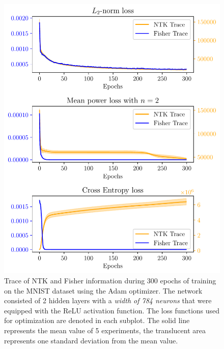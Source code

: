 \begin{figure}
	\centering
	\includegraphics{text/results/FisherNTKComparisonPlots/Triple_comparison_losses2_784.pdf}
	\caption{Trace of NTK and Fisher information during 300 epochs of training on the MNIST dataset using the Adam optimizer. The network consisted of 2 hidden layers with a \emph{width of 784 neurons} that were equipped with the ReLU activation function. The loss functions used for optimization are denoted in each subplot. The solid line represents the mean value of 5 experiments, the translucent area represents one standard deviation from the mean value.}
	\label{fig:MNISTTraceComparison3}
\end{figure}
